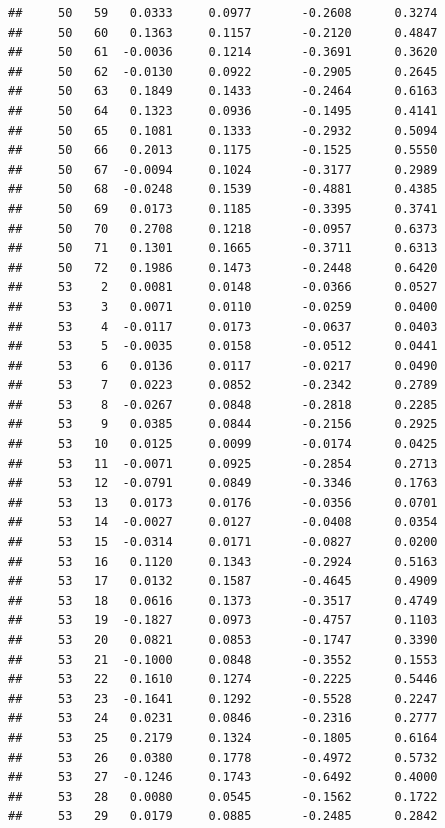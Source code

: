 \documentclass[
]{article}
\begin{document}
\begin{verbatim}
##     50   59   0.0333     0.0977       -0.2608      0.3274  
##     50   60   0.1363     0.1157       -0.2120      0.4847  
##     50   61  -0.0036     0.1214       -0.3691      0.3620  
##     50   62  -0.0130     0.0922       -0.2905      0.2645  
##     50   63   0.1849     0.1433       -0.2464      0.6163  
##     50   64   0.1323     0.0936       -0.1495      0.4141  
##     50   65   0.1081     0.1333       -0.2932      0.5094  
##     50   66   0.2013     0.1175       -0.1525      0.5550  
##     50   67  -0.0094     0.1024       -0.3177      0.2989  
##     50   68  -0.0248     0.1539       -0.4881      0.4385  
##     50   69   0.0173     0.1185       -0.3395      0.3741  
##     50   70   0.2708     0.1218       -0.0957      0.6373  
##     50   71   0.1301     0.1665       -0.3711      0.6313  
##     50   72   0.1986     0.1473       -0.2448      0.6420  
##     53    2   0.0081     0.0148       -0.0366      0.0527  
##     53    3   0.0071     0.0110       -0.0259      0.0400  
##     53    4  -0.0117     0.0173       -0.0637      0.0403  
##     53    5  -0.0035     0.0158       -0.0512      0.0441  
##     53    6   0.0136     0.0117       -0.0217      0.0490  
##     53    7   0.0223     0.0852       -0.2342      0.2789  
##     53    8  -0.0267     0.0848       -0.2818      0.2285  
##     53    9   0.0385     0.0844       -0.2156      0.2925  
##     53   10   0.0125     0.0099       -0.0174      0.0425  
##     53   11  -0.0071     0.0925       -0.2854      0.2713  
##     53   12  -0.0791     0.0849       -0.3346      0.1763  
##     53   13   0.0173     0.0176       -0.0356      0.0701  
##     53   14  -0.0027     0.0127       -0.0408      0.0354  
##     53   15  -0.0314     0.0171       -0.0827      0.0200  
##     53   16   0.1120     0.1343       -0.2924      0.5163  
##     53   17   0.0132     0.1587       -0.4645      0.4909  
##     53   18   0.0616     0.1373       -0.3517      0.4749  
##     53   19  -0.1827     0.0973       -0.4757      0.1103  
##     53   20   0.0821     0.0853       -0.1747      0.3390  
##     53   21  -0.1000     0.0848       -0.3552      0.1553  
##     53   22   0.1610     0.1274       -0.2225      0.5446  
##     53   23  -0.1641     0.1292       -0.5528      0.2247  
##     53   24   0.0231     0.0846       -0.2316      0.2777  
##     53   25   0.2179     0.1324       -0.1805      0.6164  
##     53   26   0.0380     0.1778       -0.4972      0.5732  
##     53   27  -0.1246     0.1743       -0.6492      0.4000  
##     53   28   0.0080     0.0545       -0.1562      0.1722  
##     53   29   0.0179     0.0885       -0.2485      0.2842  

\end{verbatim}
\end{document}
